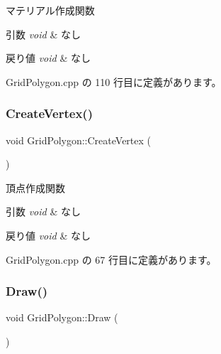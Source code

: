 マテリアル作成関数 


\begin{DoxyParams}{引数}
{\em void} & なし \\
\hline
\end{DoxyParams}

\begin{DoxyRetVals}{戻り値}
{\em void} & なし \\
\hline
\end{DoxyRetVals}


 Grid\+Polygon.\+cpp の 110 行目に定義があります。

\mbox{\label{class_grid_polygon_a07b1e9c012d36086569860a30deb85d5}} 
\subsubsection{\texorpdfstring{Create\+Vertex()}{CreateVertex()}}
{\footnotesize\ttfamily void Grid\+Polygon\+::\+Create\+Vertex (\begin{DoxyParamCaption}{ }\end{DoxyParamCaption})\hspace{0.3cm}{\ttfamily [private]}}



頂点作成関数 


\begin{DoxyParams}{引数}
{\em void} & なし \\
\hline
\end{DoxyParams}

\begin{DoxyRetVals}{戻り値}
{\em void} & なし \\
\hline
\end{DoxyRetVals}


 Grid\+Polygon.\+cpp の 67 行目に定義があります。

\mbox{\label{class_grid_polygon_a93a672fb9d5b6757c132fba8792f5459}} 
\subsubsection{\texorpdfstring{Draw()}{Draw()}}
{\footnotesize\ttfamily void Grid\+Polygon\+::\+Draw (\begin{DoxyParamCaption}{ }\end{DoxyParamCaption})}



